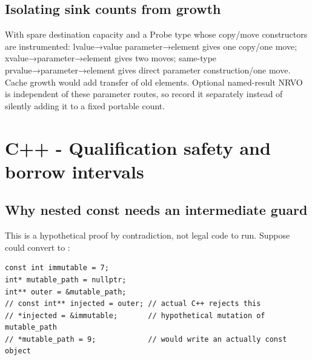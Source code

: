 \subsection{Isolating sink counts from growth}\label{03-visual-computing-i-ch018-isolating-sink-counts-from-growth}

\hypertarget{03-visual-computing-i-ch018-isolating-sink-counts-from-growth}{}

With spare destination capacity and a Probe type whose copy/move constructors are instrumented: lvalue→value parameter→element gives one copy/one move; xvalue→parameter→element gives two moves; same-type prvalue→parameter→element gives direct parameter construction/one move. Cache growth would add transfer of old elements. Optional named-result NRVO is independent of these parameter routes, so record it separately instead of silently adding it to a fixed portable count.

\section{C++ - Qualification safety and borrow intervals}\label{03-visual-computing-i-ch018-c---qualification-safety-and-borrow-intervals}

\hypertarget{03-visual-computing-i-ch018-c---qualification-safety-and-borrow-intervals}{}

\subsection{Why nested const needs an intermediate guard}\label{03-visual-computing-i-ch018-why-nested-const-needs-an-intermediate-guard}

\hypertarget{03-visual-computing-i-ch018-why-nested-const-needs-an-intermediate-guard}{}

This is a hypothetical proof by contradiction, not legal code to run. Suppose  could convert to :

\begin{verbatim}
const int immutable = 7;
int* mutable_path = nullptr;
int** outer = &mutable_path;
// const int** injected = outer; // actual C++ rejects this
// *injected = &immutable;       // hypothetical mutation of mutable_path
// *mutable_path = 9;            // would write an actually const object
\end{verbatim}


